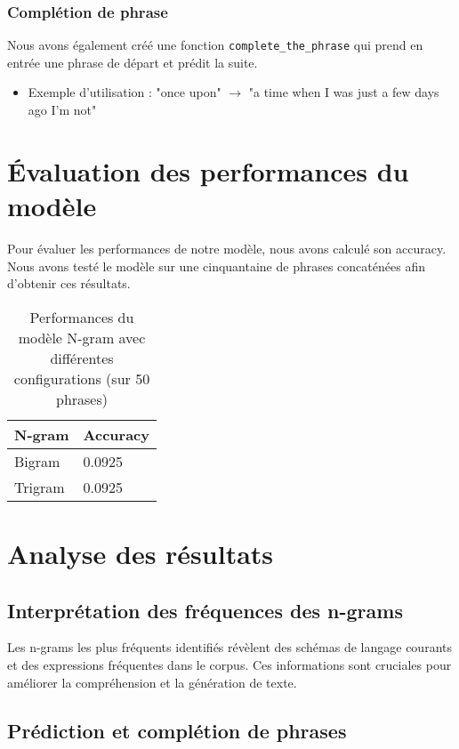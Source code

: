 \subsubsection*{Complétion de phrase}

Nous avons également créé une fonction \texttt{complete\_the\_phrase} qui prend en entrée une phrase de départ et prédit la suite.

\begin{itemize}
    \item Exemple d'utilisation : "once upon" $\rightarrow$ "a time when I was just a few days ago I’m not"
\end{itemize}

\section{Évaluation des performances du modèle}

Pour évaluer les performances de notre modèle, nous avons calculé son accuracy. Nous avons testé le modèle sur une cinquantaine de phrases concaténées afin d'obtenir ces résultats.
\begin{table}[h]
    \centering
    \begin{tabular}{|l|l|}
    \hline
    \textbf{N-gram} & \textbf{Accuracy} \\ \hline
    Bigram & 0.0925   \\ \hline
    Trigram & 0.0925  \\ \hline
    \end{tabular}
    \caption{Performances du modèle N-gram avec différentes configurations (sur 50 phrases)}
\end{table}

\section{Analyse des résultats}

\subsection{Interprétation des fréquences des n-grams}

Les n-grams les plus fréquents identifiés révèlent des schémas de langage courants et des expressions fréquentes dans le corpus. Ces informations sont cruciales pour améliorer la compréhension et la génération de texte.

\subsection{Prédiction et complétion de phrases}

